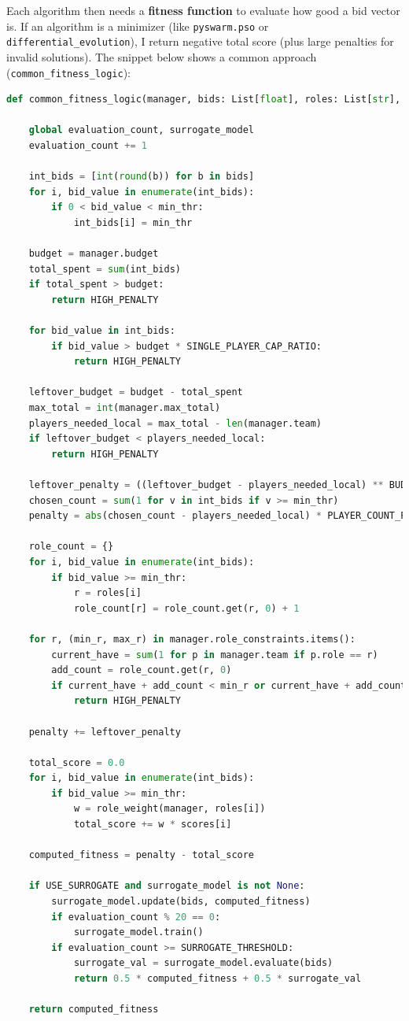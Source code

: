 \documentclass[sigconf]{acmart}
\begin{document}
	Each algorithm then needs a \textbf{fitness function} to evaluate how good a bid vector is. If an algorithm is a minimizer (like \texttt{pyswarm.pso} or \texttt{differential\_evolution}), I return negative total score (plus large penalties for invalid solutions). The snippet below shows a common approach (\texttt{common\_fitness\_logic}):
	
\begin{lstlisting}[language=Python, caption=Common fitness logic for PSO/DE/ES]
def common_fitness_logic(manager, bids: List[float], roles: List[str], scores: List[float], min_thr: int) -> float:

	global evaluation_count, surrogate_model
	evaluation_count += 1

	int_bids = [int(round(b)) for b in bids]
	for i, bid_value in enumerate(int_bids):
		if 0 < bid_value < min_thr:
			int_bids[i] = min_thr

	budget = manager.budget
	total_spent = sum(int_bids)
	if total_spent > budget:
		return HIGH_PENALTY
	
	for bid_value in int_bids:
		if bid_value > budget * SINGLE_PLAYER_CAP_RATIO:
			return HIGH_PENALTY
	
	leftover_budget = budget - total_spent
	max_total = int(manager.max_total)
	players_needed_local = max_total - len(manager.team)
	if leftover_budget < players_needed_local:
		return HIGH_PENALTY
	
	leftover_penalty = ((leftover_budget - players_needed_local) ** BUDGET_LEFTOVER_EXP) * LEFTOVER_MULTIPLIER
	chosen_count = sum(1 for v in int_bids if v >= min_thr)
	penalty = abs(chosen_count - players_needed_local) * PLAYER_COUNT_PENALTY
	
	role_count = {}
	for i, bid_value in enumerate(int_bids):
		if bid_value >= min_thr:
			r = roles[i]
			role_count[r] = role_count.get(r, 0) + 1
	
	for r, (min_r, max_r) in manager.role_constraints.items():
		current_have = sum(1 for p in manager.team if p.role == r)
		add_count = role_count.get(r, 0)
		if current_have + add_count < min_r or current_have + add_count > max_r:
			return HIGH_PENALTY
	
	penalty += leftover_penalty
	
	total_score = 0.0
	for i, bid_value in enumerate(int_bids):
		if bid_value >= min_thr:
			w = role_weight(manager, roles[i])
			total_score += w * scores[i]
	
	computed_fitness = penalty - total_score
	
	if USE_SURROGATE and surrogate_model is not None:
		surrogate_model.update(bids, computed_fitness)
		if evaluation_count % 20 == 0:
			surrogate_model.train()
		if evaluation_count >= SURROGATE_THRESHOLD:
			surrogate_val = surrogate_model.evaluate(bids)
			return 0.5 * computed_fitness + 0.5 * surrogate_val
	
	return computed_fitness
\end{lstlisting}
	
\end{document}
